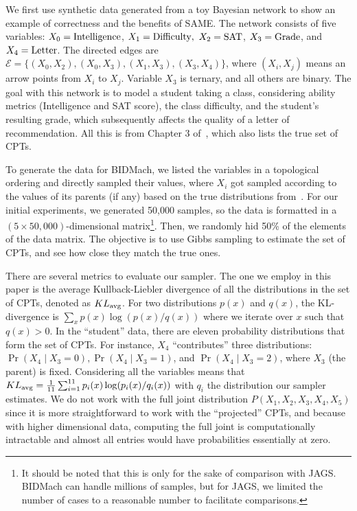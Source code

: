 \documentclass{article} %
\begin{document}
We first use synthetic data generated from a toy Bayesian network to show an example of correctness
and the benefits of SAME. The network consists of five variables: $X_0 = {\rm Intelligence}$, $X_1 =
{\rm Difficulty},$ $X_2 = {\rm SAT}$, $X_3 = {\rm Grade}$, and $X_4 = {\rm Letter}$. The directed
edges are $\mathcal{E} = \{(X_0, X_2), (X_0, X_3), (X_1,X_3), (X_3,X_4)\}$, where $(X_i,X_j)$ means
an arrow points from $X_i$ to $X_j$.  Variable $X_3$ is ternary, and all others are binary. The goal
with this network is to model a student taking a class, considering ability metrics (Intelligence
and SAT score), the class difficulty, and the student's resulting grade, which subsequently affects
the quality of a letter of recommendation. All this is from Chapter 3 of~\citet{Koller2009}, which
also lists the true set of CPTs.

To generate the data for BIDMach, we listed the variables in a topological ordering and directly
sampled their values, where $X_i$ got sampled according to the values of its parents (if any) based
on the true distributions from~\citet{Koller2009}. For our initial experiments, we generated 50,000
samples, so the data is formatted in a $(5\times 50,000)$-dimensional matrix\footnote{It should be
noted that this is only for the sake of comparison with JAGS. BIDMach can handle millions of
samples, but for JAGS, we limited the number of cases to a reasonable number to facilitate
comparisons.}. Then, we randomly hid 50\% of the elements of the data matrix. The objective is to
use Gibbs sampling to estimate the set of CPTs, and see how close they match the true ones.

There are several metrics to evaluate our sampler. The one we employ in this paper is the average
Kullback-Liebler divergence of all the distributions in the set of CPTs, denoted as $KL_{\rm avg}$.
For two distributions $p(x)$ and $q(x)$, the KL-divergence is $\sum_x p(x) \log(p(x)/q(x))$ where we
iterate over $x$ such that $q(x) > 0$. In the ``student'' data, there are eleven probability
distributions that form the set of CPTs. For instance, $X_4$ ``contributes'' three distributions:
$\Pr(X_4 \mid X_3 = 0), \Pr(X_4 \mid X_3 = 1)$, and $\Pr(X_4 \mid X_3 = 2)$, where $X_3$ (the
parent) is fixed. Considering all the variables means that $KL_{\rm avg} = \frac{1}{11}
\sum_{i=1}^{11} p_i(x) \log(p_i(x)/q_i(x))$ with $q_i$ the distribution our sampler estimates. We do
not work with the full joint distribution $P(X_1,X_2,X_3,X_4,X_5)$ since it is more straightforward
to work with the ``projected'' CPTs, and because with higher dimensional data, computing the full
joint is computationally intractable and almost all entries would have probabilities essentially at
zero.
\end{document}
